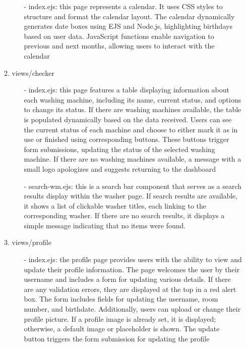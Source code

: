 \documentclass[conference]{IEEEtran}
\begin{document}
\begin{enumerate}
\begin{enumerate}
\begin{itemize}
                    \item[-] index.ejs: this page represents a calendar. It uses CSS styles to structure and format the calendar layout. The calendar dynamically generates date boxes using EJS and Node.js, highlighting birthdays based on user data. JavaScript functions enable navigation to previous and next months, allowing users to interact with the calendar
                \end{itemize}
            \item views/checker
                \begin{itemize}
                    \item[-] index.ejs: this page features a table displaying information about each washing machine, including its name, current status, and options to change its status. If there are washing machines available, the table is populated dynamically based on the data received. Users can see the current status of each machine and choose to either mark it as in use or finished using corresponding buttons. These buttons trigger form submissions, updating the status of the selected washing machine. If there are no washing machines available, a message with a small logo apologizes and suggests returning to the dashboard
                    \item[-] search-wm.ejs: this is a search bar component that serves as a search results display within the washer page. If search results are available, it shows a list of clickable washer titles, each linking to the corresponding washer. If there are no search results, it displays a simple message indicating that no items were found.
                \end{itemize}
            \item views/profile
                \begin{itemize}
                    \item[-] index.ejs: the profile page provides users with the ability to view and update their profile information. The page welcomes the user by their username and includes a form for updating various details. If there are any validation errors, they are displayed at the top in a red alert box. The form includes fields for updating the username, room number, and birthdate. Additionally, users can upload or change their profile picture. If a profile image is already set, it is displayed; otherwise, a default image or placeholder is shown. The update button triggers the form submission for updating the profile
                \end{itemize}

\end{enumerate}
\end{enumerate}
\end{document}
